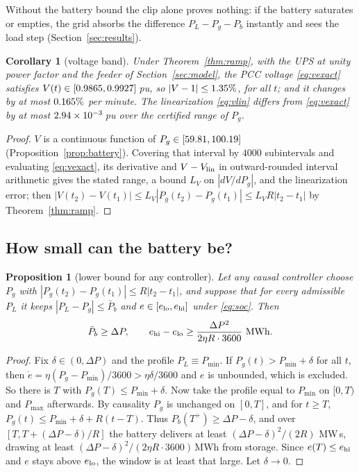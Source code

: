 \documentclass[journal]{IEEEtran}
\newtheorem{proposition}{Proposition}
\newtheorem{corollary}{Corollary}
\theoremstyle{remark}
\newcommand{\Pmin}{P_{\min}}
\newcommand{\Pmax}{P_{\max}}
\newcommand{\Pbar}{\bar P_b}
\begin{document}
Without the battery bound the clip alone proves nothing: if the battery saturates or empties, the grid absorbs the
difference $P_L-P_g-P_b$ instantly and sees the load step (Section~\ref{sec:results}).

\begin{corollary}[voltage band]\label{cor:voltage}
Under Theorem~\ref{thm:ramp}, with the UPS at unity power factor and the feeder of Section~\ref{sec:model}, the PCC
voltage \eqref{eq:vexact} satisfies $V(t)\in[0.9865,0.9927]$\,pu, so $|V-1|\le1.35\%$, for all $t$; and it
changes by at most $0.165\%$ per minute. The linearization \eqref{eq:vlin} differs from \eqref{eq:vexact} by at
most $2.94\times10^{-3}$\,pu over the certified range of $P_g$.
\end{corollary}
\begin{proof}
$V$ is a continuous function of $P_g\in[59.81,100.19]$ (Proposition~\ref{prop:battery}). Covering that interval by
$4000$ subintervals and evaluating \eqref{eq:vexact}, its derivative and $V-V_{\rm lin}$ in outward-rounded interval
arithmetic gives the stated range, a bound $L_V$ on $|dV/dP_g|$, and the linearization error; then
$|V(t_2)-V(t_1)|\le L_V|P_g(t_2)-P_g(t_1)|\le L_VR|t_2-t_1|$ by Theorem~\ref{thm:ramp}.
\end{proof}

\subsection{How small can the battery be?}
\begin{proposition}[lower bound for any controller]\label{prop:lower}
Let any causal controller choose $P_g$ with $|P_g(t_2)-P_g(t_1)|\le R|t_2-t_1|$, and suppose that for every
admissible $P_L$ it keeps $|P_L-P_g|\le\Pbar$ and $e\in[e_{\rm lo},e_{\rm hi}]$ under \eqref{eq:soc}. Then
\[
\Pbar\ge\Delta P,\qquad e_{\rm hi}-e_{\rm lo}\ge\frac{\Delta P^2}{2\eta R\cdot 3600}\ \text{MWh}.
\]
\end{proposition}
\begin{proof}
Fix $\delta\in(0,\Delta P)$ and the profile $P_L\equiv\Pmin$. If $P_g(t)>\Pmin+\delta$ for all $t$, then
$\dot e=\eta(P_g-\Pmin)/3600>\eta\delta/3600$ and $e$ is unbounded, which is excluded. So there is $T$ with
$P_g(T)\le\Pmin+\delta$. Now take the profile equal to $\Pmin$ on $[0,T)$ and $\Pmax$ afterwards. By causality $P_g$
is unchanged on $[0,T]$, and for $t\ge T$, $P_g(t)\le\Pmin+\delta+R(t-T)$. Thus $P_b(T^+)\ge\Delta P-\delta$, and
over $[T,T+(\Delta P-\delta)/R]$ the battery delivers at least $(\Delta P-\delta)^2/(2R)$ MW\,s, drawing at least
$(\Delta P-\delta)^2/(2\eta R\cdot3600)$\,MWh from storage. Since $e(T)\le e_{\rm hi}$ and $e$ stays above
$e_{\rm lo}$, the window is at least that large. Let $\delta\to0$.
\end{proof}
\end{document}
